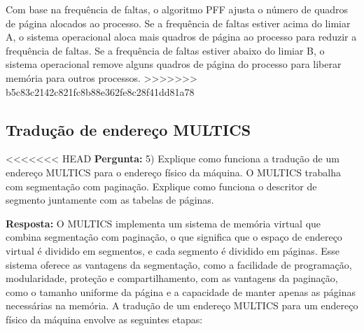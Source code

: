 \documentclass{article}
\begin{document}
Com base na frequência de faltas, o algoritmo PFF ajusta o número de quadros de página alocados ao processo. Se a frequência de faltas estiver acima do limiar A, o sistema operacional aloca mais quadros de página ao processo para reduzir a frequência de faltas. Se a frequência de faltas estiver abaixo do limiar B, o sistema operacional remove alguns quadros de página do processo para liberar memória para outros processos.
>>>>>>> b5c83c2142c821fc8b88e362fe8c28f41dd81a78

\subsection{Tradução de endereço MULTICS}

<<<<<<< HEAD
\textbf{Pergunta:} 5) Explique como funciona a tradução de um endereço MULTICS para o endereço físico da máquina. O MULTICS trabalha com segmentação com paginação. Explique como funciona o descritor de segmento juntamente com as tabelas de páginas. \textcite[p. 170]{tanenbaum2021}   \newline

\textbf{Resposta:} O MULTICS implementa um sistema de memória virtual que combina segmentação com paginação, o que significa que o espaço de endereço virtual é dividido em segmentos, e cada segmento é dividido em páginas. Esse sistema oferece as vantagens da segmentação, como a facilidade de programação, modularidade, proteção e compartilhamento, com as vantagens da paginação, como o tamanho uniforme da página e a capacidade de manter apenas as páginas necessárias na memória.
A tradução de um endereço MULTICS para um endereço físico da máquina envolve as seguintes etapas:
\end{document}
